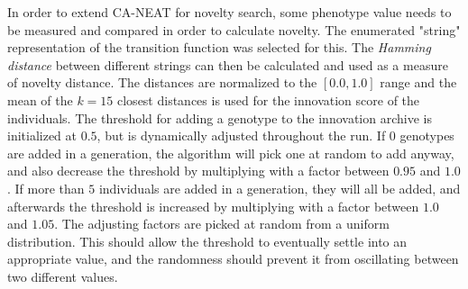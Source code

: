 In order to extend CA-NEAT for novelty search, some phenotype value needs to be measured and compared in order to calculate novelty.
The enumerated "string" representation of the transition function was selected for this.
The \textit{Hamming distance} between different strings can then be calculated and used as a measure of novelty distance.
The distances are normalized to the $[0.0, 1.0]$ range and the mean of the $k=15$ closest distances is used for the innovation score of the individuals.
The threshold for adding a genotype to the innovation archive is initialized at $0.5$, but is dynamically adjusted throughout the run.
If $0$ genotypes are added in a generation, the algorithm will pick one at random to add anyway, and also decrease the threshold by multiplying with a factor between $0.95$ and $1.0$.
If more than $5$ individuals are added in a generation, they will all be added, and afterwards the threshold is increased by multiplying with a factor between $1.0$ and $1.05$.
The adjusting factors are picked at random from a uniform distribution.
This should allow the threshold to eventually settle into an appropriate value, and the randomness should prevent it from oscillating between two different values.

